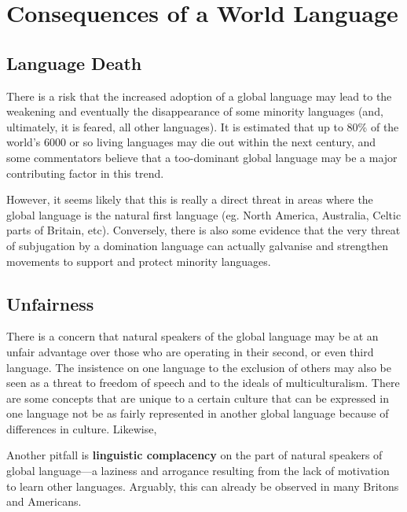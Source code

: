 \documentclass[../main.tex]{subfiles}
\begin{document}
    \section{Consequences of a World Language}
        \subsection{Language Death}
            There is a risk that the increased adoption of a global language may lead to the weakening and eventually the disappearance of some minority languages (and, ultimately, it is feared, all other languages). It is estimated that up to 80\% of the world's 6000 or so living languages may die out within the next century, and some commentators believe that a too-dominant global language may be a major contributing factor in this trend. \par
            However, it seems likely that this is really a direct threat in areas where the global language is the natural first language (eg. North America, Australia, Celtic parts of Britain, etc). Conversely, there is also some evidence that the very threat of subjugation by a domination language can actually galvanise and strengthen movements to support and protect minority languages. 

        \subsection{Unfairness}
            There is a concern that natural speakers of the global language may be at an unfair advantage over those who are operating in their second, or even third language. The insistence on one language to the exclusion of others may also be seen as a threat to freedom of speech and to the ideals of multiculturalism. There are some concepts that are unique to a certain culture that can be expressed in one language not be as fairly represented in another global language because of differences in culture. Likewise, \par 
            Another pitfall is \textbf{linguistic complacency} on the part of natural speakers of global language---a laziness and arrogance resulting from the lack of motivation to learn other languages. Arguably, this can already be observed in many Britons and Americans.
\end{document}
